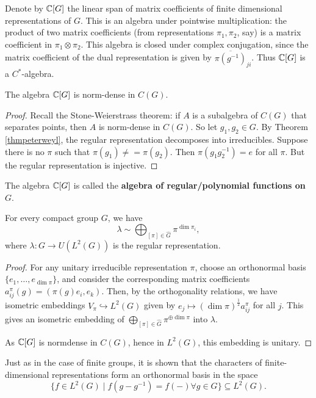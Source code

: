 \documentclass[11pt, english]{article}
\begin{document}
Denote by $\mathbb{C}[G]$ the linear span of matrix coefficients of finite dimensional representations of $G$. This is an algebra under pointwise multiplication: the product of two matrix coefficients (from representations $\pi_1,\pi_2$, say) is a matrix coefficient in $\pi_1 \otimes \pi_2$. This algebra is closed under complex conjugation, since the matrix coefficient of the dual representation is given by $\overline{\pi(g^{-1})}_{ji}$. Thus $\mathbb{C}[G]$ is a $C^\ast$-algebra.

\begin{corr}
  The algebra $\mathbb{C}[G]$ is norm-dense in $C(G)$.
\end{corr}
\begin{proof}
Recall the Stone-Weierstrass theorem: if $A$ is a subalgebra of $C(G)$ that separates points, then $A$ is norm-dense in $C(G)$. So let $g_1,g_2 \in G$. By Theorem \ref{thmpeterweyl}, the regular representation decomposes into irreducibles. Suppose there is no $\pi$ such that $\pi(g_1) \neq=\pi(g_2)$. Then $\pi(g_1g_2^{-1})=e$ for all $\pi$. But the regular representation is injective.
\end{proof}

The algebra $\mathbb{C}[G]$ is called the \textbf{algebra of regular/polynomial functions on $G$}.

\begin{thm}
  For every compact group $G$, we have 
$$
\lambda \sim \bigoplus_{[\pi] \in \widehat G} \pi^{\dim \pi_i},
$$
where $\lambda:G \to U(L^2(G))$ is the regular representation.
\end{thm}
\begin{proof}
For any unitary irreducible representation $\pi$, choose an orthonormal basis $\{ e_1, \ldots, e_{\dim \pi} \}$, and consider the corresponding matrix coefficients $a_{ij}^\pi(g)=(\pi(g)e_i,e_k)$. Then, by the orthogonality relations, we have isometric embeddings  $V_\pi \hookrightarrow L^2(G)$ given by $e_j \mapsto (\dim \pi)^{\frac 12} a_{ij}^\pi$ for all $j$. This gives an isometric embedding of $\bigoplus_{[\pi] \in \widehat G} \pi^{\oplus \dim \pi}$ into $\lambda$. 

As $\mathbb{C}[G]$ is normdense in $C(G)$, hence in $L^2(G)$, this embedding is unitary.
\end{proof}

Just as in the case of finite groups, it is shown that the characters of finite-dimensional representations form an orthonormal basis in the space 
$$
\{ f \in L^2(G) \mid f(g - g^{-1}) = f(-) \forall g \in G \} \subseteq L^2(G).
$$
\end{document}

